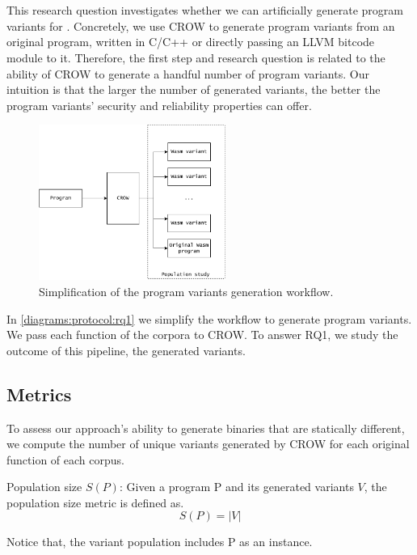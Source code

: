 
\section{\rqone}
\label{rq1:method}
This research question investigates whether we can artificially generate program variants for \wasm. Concretely, we use CROW to generate program variants from an original program, written in C/C++ or directly passing an LLVM bitcode module to it. Therefore, the first step and research question is related to the ability of CROW to generate a handful number of program variants. Our intuition is that the larger the number of generated variants, the better the program variants' security and reliability properties can offer.



\begin{figure}[h]
    \centering
    \includegraphics[height=2in]{diagrams/Rq1.pdf}
    \caption{Simplification of the program variants generation workflow.}
    \label{diagrams:protocol:rq1}
\end{figure}


In \autoref{diagrams:protocol:rq1} we simplify the workflow to generate \wasm program variants. We pass each function of the corpora to CROW. To answer RQ1, we study the outcome of this pipeline, the generated variants. 

\subsection{Metrics}

To assess our approach's ability to generate \wasm binaries that are statically different, we compute the number of unique variants generated by CROW for each original function of each corpus. 



\begin{metric}{Population size $S(P)$:}\label{metric:md5sum}
    Given a program P and its generated variants $V$, the population size metric is defined as.\\
    $$
        S(P)=|V|
    $$

    Notice that, the variant population includes P as an instance.
\end{metric}

